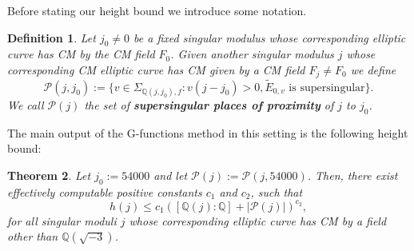 \documentclass[12pt,twoside,a4paper]{article}
\theoremstyle{plain}%
\newtheorem{theorem}{Theorem}[section] %
\newtheorem{definition}[theorem]{Definition} %
\newcommand{\Q}{\mathbb{Q}}
\newcommand{\CP}{\mathcal{P}}
\begin{document}
Before stating our height bound we introduce some notation.
\begin{definition}\label{defnproblematic}
	Let $j_0\neq 0$ be a fixed singular modulus whose corresponding elliptic curve has CM by the CM field $F_0$. Given another singular modulus $j$ whose corresponding CM elliptic curve has CM given by a CM field $F_j\neq F_0$ we define
	 \begin{equation}\CP(j,j_0):=\{ v\in \Sigma_{\Q(j,j_0),f}: v(j-j_0)>0, \tilde{E}_{0,v}\text{ is supersingular}\}.
		\end{equation}We call $\CP(j)$ the set of \textbf{supersingular places of proximity} of $j$ to $j_0$.
	\end{definition}

The main output of the G-functions method in this setting is the following height bound:

\begin{theorem}\label{heightboundcm}Let $j_0:=54000$ and let $\CP(j):=\CP(j,54000)$. Then, there exist effectively computable positive constants $c_1$ and $c_2$, such that
\begin{equation}\label{eq:htboundmain}h(j)\leq c_1 ([\Q(j):\Q] +|\CP(j)| )^{c_2},\end{equation}
for all singular moduli $j$ whose corresponding elliptic curve has CM by a field other than $\Q(\sqrt{-3})$.\end{theorem}
\end{document}
